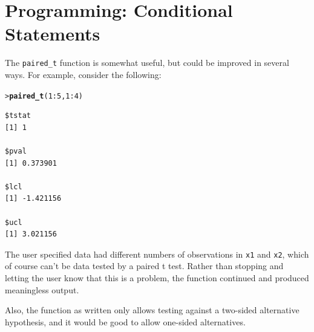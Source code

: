 \documentclass[12pt,oneside]{book}\usepackage[]{graphicx}\usepackage[]{color}
\makeatletter
\newcommand{\hlnum}[1]{\textcolor[rgb]{0.686,0.059,0.569}{#1}}%
\newcommand{\hlopt}[1]{\textcolor[rgb]{0,0,0}{#1}}%
\newcommand{\hlstd}[1]{\textcolor[rgb]{0.345,0.345,0.345}{#1}}%
\newcommand{\hlkwd}[1]{\textcolor[rgb]{0.737,0.353,0.396}{\textbf{#1}}}%
\newenvironment{kframe}{%
 \def\at@end@of@kframe{}%
 \ifinner\ifhmode%
  \def\at@end@of@kframe{\end{minipage}}%
  \begin{minipage}{\columnwidth}%
 \fi\fi%
 \def\FrameCommand##1{\hskip\@totalleftmargin \hskip-\fboxsep
 \colorbox{shadecolor}{##1}\hskip-\fboxsep
     \hskip-\linewidth \hskip-\@totalleftmargin \hskip\columnwidth}%
 \MakeFramed {\advance\hsize-\width
   \@totalleftmargin\z@ \linewidth\hsize
   \@setminipage}}%
 {\par\unskip\endMakeFramed%
 \at@end@of@kframe}
\newenvironment{knitrout}{}{} %
\makeatother
\begin{document}
\section{Programming: Conditional Statements}
The \verb+paired_t+ function is somewhat useful, but could be improved in several ways. For example, consider the following:
\begin{knitrout}
\color{fgcolor}\begin{kframe}
\begin{alltt}
\hlstd{> }\hlkwd{paired_t}\hlstd{(}\hlnum{1}\hlopt{:}\hlnum{5}\hlstd{,} \hlnum{1}\hlopt{:}\hlnum{4}\hlstd{)}
\end{alltt}


{\ttfamily\noindent\color{warningcolor}{Warning in x1 - x2: longer object length is not a multiple of shorter object length}}

{\ttfamily\noindent\color{warningcolor}{Warning in x1 - x2: longer object length is not a multiple of shorter object length}}\begin{verbatim}
$tstat
[1] 1

$pval
[1] 0.373901

$lcl
[1] -1.421156

$ucl
[1] 3.021156
\end{verbatim}
\end{kframe}
\end{knitrout}
The user specified data had different numbers of observations in \verb+x1+ and \verb+x2+, which of course can't be data tested by a paired t test. Rather than stopping and letting the user know that this is a problem, the function continued and produced meaningless output.

Also, the function as written only allows testing against a two-sided alternative hypothesis, and it would be good to allow one-sided alternatives.
\end{document}
